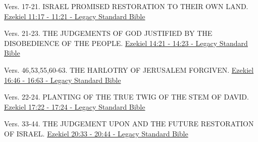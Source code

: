 \documentclass[
  ignorenonframetext,
]{beamer}
\begin{document}
\begin{frame}{11}
\label{section-91}
\begin{block}{Vers. 17-21. ISRAEL PROMISED RESTORATION TO THEIR OWN
LAND.}
\label{vers.-17-21.-israel-promised-restoration-to-their-own-land.}
\href{https://read.lsbible.org/?q=ezek11\%3A17-21}{Ezekiel 11:17 - 11:21
- Legacy Standard Bible}
\end{block}
\end{frame}

\begin{frame}{14}
\label{section-92}
\begin{block}{Vers. 21-23. THE JUDGEMENTS OF GOD JUSTIFIED BY THE
DISOBEDIENCE OF THE PEOPLE.}
\label{vers.-21-23.-the-judgements-of-god-justified-by-the-disobedience-of-the-people.}
\href{https://read.lsbible.org/?q=ezek14\%3A21-23}{Ezekiel 14:21 - 14:23
- Legacy Standard Bible}
\end{block}
\end{frame}

\begin{frame}{16}
\label{section-93}
\begin{block}{Vers. 46,53,55,60-63. THE HARLOTRY OF JERUSALEM FORGIVEN.}
\label{vers.-46535560-63.-the-harlotry-of-jerusalem-forgiven.}
\href{https://read.lsbible.org/?q=ezek16\%3A46-63}{Ezekiel 16:46 - 16:63
- Legacy Standard Bible}
\end{block}
\end{frame}

\begin{frame}{17}
\label{section-94}
\begin{block}{Vers. 22-24. PLANTING OF THE TRUE TWIG OF THE STEM OF
DAVID.}
\label{vers.-22-24.-planting-of-the-true-twig-of-the-stem-of-david.}
\href{https://read.lsbible.org/?q=ezek17\%3A22-24}{Ezekiel 17:22 - 17:24
- Legacy Standard Bible}
\end{block}
\end{frame}

\begin{frame}{20}
\label{section-95}
\begin{block}{Vers. 33-44. THE JUDGEMENT UPON AND THE FUTURE RESTORATION
OF ISRAEL.}
\label{vers.-33-44.-the-judgement-upon-and-the-future-restoration-of-israel.}
\href{https://read.lsbible.org/?q=ezek20\%3A33-44}{Ezekiel 20:33 - 20:44
- Legacy Standard Bible}
\end{block}
\end{frame}
\end{document}
